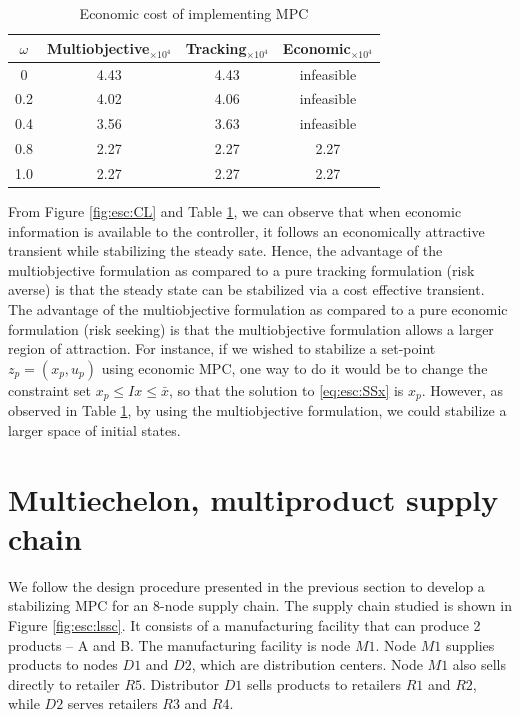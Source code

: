 \documentclass{elsarticle}
\theoremstyle{definition}
\begin{document}
\begin{table}[h]
\caption{Economic cost of implementing MPC}
\label{tab:esc:CL}
\centering
\begin{tabular}{cccc}\toprule
$\omega$ & Multiobjective$ _{ \times 10^{4}}$ & Tracking$ _{ \times 10^{4}}$ & Economic$ _{ \times 10^{4}}$ \\
\midrule
0 & 4.43 & 4.43 & infeasible \\
0.2 & 4.02 & 4.06 & infeasible \\
0.4 & 3.56 & 3.63 & infeasible \\
0.8 & 2.27 & 2.27 & 2.27 \\
1.0 & 2.27 & 2.27 & 2.27 \\
\bottomrule
\end{tabular}
\end{table}

From Figure \ref{fig:esc:CL} and Table \ref{tab:esc:CL}, we can
observe that when economic information is available to the controller,
it follows an economically attractive transient while stabilizing the
steady sate. Hence, the advantage of the multiobjective formulation as
compared to a pure tracking formulation (risk averse) is that the
steady state can be stabilized via a cost effective transient. The
advantage of the multiobjective formulation as compared to a pure
economic formulation (risk seeking) is that the multiobjective
formulation allows a larger region of attraction. For instance, if we
wished to stabilize a set-point $z_p = (x_p,u_p)$ using economic MPC,
one way to do it would be to change the constraint set $x_p \leq Ix \leq
\bar{x}$, so that the solution to \eqref{eq:esc:SSx} is
$x_p$. However, as observed in Table \ref{tab:esc:CL}, by using the
multiobjective formulation, we could stabilize a larger space of
initial states. 

\section{Multiechelon, multiproduct supply chain}
\label{sec:multi}
We follow the design procedure presented in the previous section to
develop a stabilizing MPC for an 8-node supply chain. The supply chain
studied is shown in Figure \ref{fig:esc:lssc}. It consists of a
manufacturing facility that can produce 2 products -- A and B. The
manufacturing facility is node $M1$. Node $M1$ supplies products to
nodes $D1$ and $D2$, which are distribution centers. Node $M1$ also
sells directly to retailer $R5$. Distributor $D1$ sells products to
retailers $R1$ and $R2$, while $D2$ serves retailers $R3$ and $R4$. 
\end{document}
